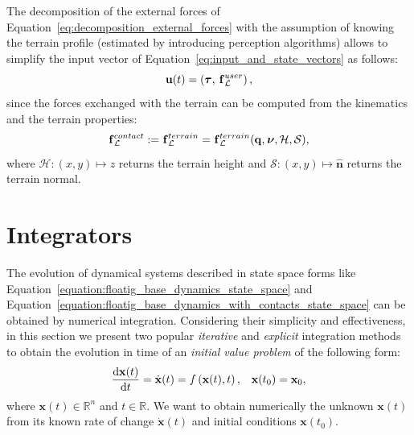 The decomposition of the external forces of Equation~\eqref{eq:decomposition_external_forces} with the assumption of knowing the terrain profile (\eg estimated by introducing perception algorithms) allows to simplify the input vector of Equation~\eqref{eq:input_and_state_vectors} as follows:
%
\begin{equation*}
    \mathbf{u}(t) = \left( \boldsymbol{\tau},\, \prescript{}{}{\mathbf{f}}_\mathcal{L}^{user} \right)
    ,
\end{equation*}
%
since the forces exchanged with the terrain can be computed from the kinematics and the terrain properties:
%
\begin{equation*}
    \prescript{}{}{\mathbf{f}}_\mathcal{L}^{contact} := \prescript{}{}{\mathbf{f}}_\mathcal{L}^{terrain} = \prescript{}{}{\mathbf{f}}_\mathcal{L}^{terrain}(\mathbf{q}, \prescript{}{}{\boldsymbol{\nu}}, \mathcal{H}, \mathcal{S})
    ,
\end{equation*}
%
where $\mathcal{H}: (x, y) \mapsto z$ returns the terrain height and $\mathcal{S}: (x, y) \mapsto \hat{\mathbf{n}}$ returns the terrain normal.

\newpage
\section{Integrators}
\label{sec:integrators}

The evolution of dynamical systems described in state space forms like Equation~\eqref{equation:floatig_base_dynamics_state_space} and Equation~\eqref{equation:floatig_base_dynamics_with_contacts_state_space} can be obtained by numerical integration.
Considering their simplicity and effectiveness, in this section we present two popular \emph{iterative} and \emph{explicit} integration methods to obtain the evolution in time of an \emph{initial value problem} of the following form:
%
\begin{align*}
    \dv{\mathbf{x}(t)}{t} = \dot{\mathbf{x}}(t) = f\left(\mathbf{x}(t), t\right),
    &&
    \mathbf{x}(t_0) = \mathbf{x}_0
    ,
\end{align*}
%
where $\mathbf{x}(t) \in \mathbb{R}^n$ and $t \in \mathbb{R}$.
We want to obtain numerically the unknown $\mathbf{x}(t)$ from its known rate of change $\dot{\mathbf{x}}(t)$ and initial conditions $\mathbf{x}(t_0)$.

